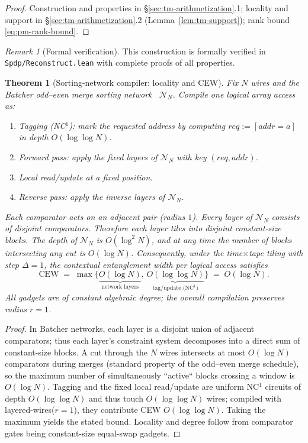 \documentclass[12pt]{article}
\newtheorem{theorem}{Theorem}
\theoremstyle{definition}
\theoremstyle{definition}
\theoremstyle{remark}
\newtheorem{remark}{Remark}
\theoremstyle{remark}
\begin{document}
\begin{proof}
Construction and properties in \S\ref{sec:tm-arithmetization}.1; locality and support in \S\ref{sec:tm-arithmetization}.2 (Lemma~\ref{lem:tm-support}); rank bound \eqref{eq:pm-rank-bound}.
\end{proof}

\begin{remark}[Formal verification]
This construction is formally verified in \texttt{Spdp/Reconstruct.lean} with complete proofs of all properties.
\end{remark}

\begin{theorem}[Sorting-network compiler: locality and CEW]
\label{thm:sn-cew}
Fix $N$ wires and the Batcher odd--even merge sorting network~\cite{batcher1968} $\mathcal N_N$.
Compile one logical array access as:
\begin{enumerate}
\item Tagging (NC$^1$): mark the requested address by computing $req:=[addr=a]$ in depth $O(\log\log N)$.
\item Forward pass: apply the fixed layers of $\mathcal N_N$ with key $(req,addr)$.
\item Local read/update at a fixed position.
\item Reverse pass: apply the inverse layers of $\mathcal N_N$.
\end{enumerate}
Each comparator acts on an adjacent pair (radius $1$). Every layer of $\mathcal N_N$ consists of disjoint comparators.
Therefore each layer tiles into disjoint constant-size blocks. The depth of $\mathcal N_N$ is $O(\log^2 N)$, and at any time the number of blocks intersecting any cut is $O(\log N)$.
Consequently, under the time$\times$tape tiling with step $\Delta=1$, the contextual entanglement width per logical access satisfies
\[
\mathrm{CEW} \;=\; \max\{\underbrace{O(\log N)}_{\text{network layers}},\, \underbrace{O(\log\log N)}_{\text{tag/update (NC$^1$)}}\} \;=\; O(\log N).
\]
All gadgets are of constant algebraic degree; the overall compilation preserves radius $r=1$.
\end{theorem}
\begin{proof}
In Batcher networks, each layer is a disjoint union of adjacent comparators; thus each layer's constraint system decomposes into a direct sum of constant-size blocks.
A cut through the $N$ wires intersects at most $O(\log N)$ comparators during merges (standard property of the odd--even merge schedule),
so the maximum number of simultaneously ``active`` blocks crossing a window is $O(\log N)$.
Tagging and the fixed local read/update are uniform NC$^1$ circuits of depth $O(\log\log N)$ and thus touch $O(\log\log N)$ wires; compiled with layered-wires($r{=}1$), they contribute CEW $O(\log\log N)$.
Taking the maximum yields the stated bound. Locality and degree follow from comparator gates being constant-size equal-swap gadgets.
\end{proof}
\end{document}
